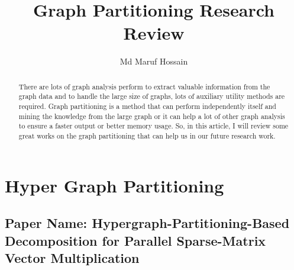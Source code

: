 \documentclass[conference, onecolumn]{IEEEtran}
\begin{document}
\title{Graph Partitioning Research Review}


\author{Md Maruf Hossain}

\maketitle

\begin{abstract}
There are lots of graph analysis perform to extract valuable information from the graph data and to handle the large 
size of graphs, lots of auxiliary utility methods are required. Graph partitioning is a method that can perform 
independently itself and mining the knowledge from the large graph or it can help a lot of other graph analysis to 
ensure a faster output or better memory usage. So, in this article, I will review some great works on the graph partitioning 
that can help us in our future research work.    
\end{abstract}

\section{Hyper Graph Partitioning}
\subsection{Paper Name: Hypergraph-Partitioning-Based Decomposition for Parallel Sparse-Matrix Vector Multiplication} 
\end{document}

